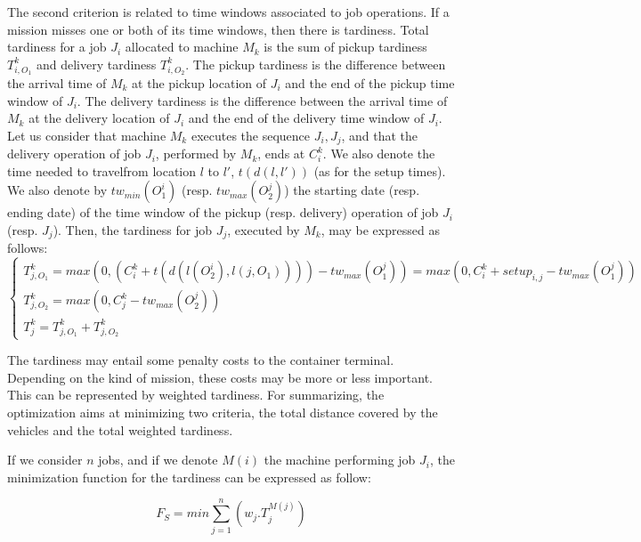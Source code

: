 \documentclass[a4paper,10pt]{article}
\begin{document}
The second criterion is related to time windows associated to job operations. If a mission misses one or both of its time windows, then there is tardiness. Total tardiness for a job $J_i$ allocated to machine $M_k$ is the sum of pickup tardiness $T^k_{i,O_1}$ and delivery tardiness $T^k_{i,O_2}$. The pickup tardiness is the difference between the arrival time of $M_k$ at the pickup location of $J_i$ and the end of the pickup time window of $J_i$. The delivery tardiness is the difference between the arrival time of $M_k$ at the delivery location of $J_i$ and the end of the delivery time window of $J_i$. \\

Let us consider that machine $M_k$ executes the sequence $J_i,J_j$, and that the delivery operation of job $J_i$, performed by $M_k$, ends at $C^k_i$. We also denote the time needed to travelfrom location $l$ to $l'$, $t(d(l,l'))$ (as for the setup times). We also denote by $tw_{min}(O^i_1)$ (resp. $tw_{max}(O^j_2)$) the starting date (resp. ending date) of the time window of the pickup (resp. delivery) operation of job $J_i$ (resp. $J_j$). Then, the tardiness for job $J_j$, executed by $M_k$, may be expressed as follows: 
\begin{equation*}
 \begin{cases}
    T^k_{j,O_1} = max(0, (C^k_i + t(d(l(O^i_2),l(j, O_1)))) - tw_{max}(O^j_1)) = max(0,C^k_i+setup_{i,j}-tw_{max}(O^j_1))\\
    T^k_{j,O_2} = max(0 ,C^k_j - tw_{max}(O^j_2))\\
    T^k_{j} = T^k_{j,O_1} + T^k_{j,O_2}
\end{cases}
\end{equation*}

The tardiness may entail some penalty costs to the container terminal. Depending on the kind of mission, these costs may be more or less important. This can be represented by weighted tardiness. For summarizing, the optimization aims at minimizing two criteria, the total distance covered by the vehicles and the total weighted tardiness. 

If we consider $n$ jobs, and if we denote $M(i)$ the machine performing job $J_i$, the minimization function for the tardiness can be expressed as follow:

\begin{equation*}
    F_S = min \sum_{j=1}^{n}(w_j.T^{M(j)}_{j})
\end{equation*}
 
\end{document}
